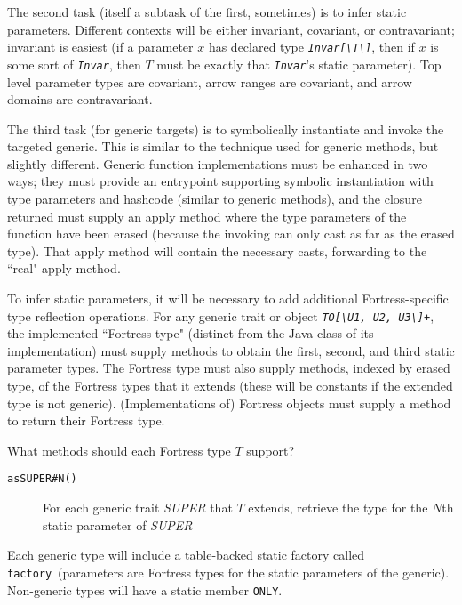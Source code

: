 \documentclass[11pt]{article}
\newcommand{\jvm}[1]{{\tt #1}}
\newcommand{\ftt}[1]{{\tt\slshape{#1}}}
\def\BS{\textbackslash}
\begin{document}
The second task (itself a subtask of the first, sometimes) is to infer static parameters.  Different contexts will be either invariant, covariant, or contravariant; invariant is easiest (if a parameter $x$ has declared type \ftt{Invar[\BS T\BS]}, then if $x$ is some sort of \ftt{Invar}, then $T$ must be exactly that \ftt{Invar}'s static parameter).  Top level parameter types are covariant, arrow ranges are covariant, and arrow domains are contravariant.

The third task (for generic targets) is to symbolically instantiate and invoke the targeted generic.  This is similar to the technique used for generic methods, but slightly different.  Generic function implementations must be enhanced in two ways; they must provide an entrypoint supporting symbolic instantiation with type parameters and hashcode (similar to generic methods), and the closure returned must supply an apply method where the type parameters of the function have been erased (because the invoking can only cast as far as the erased type).  That apply method will contain the necessary casts, forwarding to the ``real" apply method.

To infer static parameters, it will be necessary to add additional Fortress-specific type reflection operations.
For any generic trait or object \ftt{TO[\BS U1, U2, U3\BS]+}, the implemented ``Fortress type" (distinct from the Java class of its implementation) must supply methods to obtain the first, second, and third static parameter types.  The Fortress type must also supply methods, indexed by erased type, of the Fortress types that it extends (these will be constants if the extended type is not generic).  (Implementations of) Fortress objects must supply a method to return their Fortress type.

What methods should each Fortress type $T$ support?
\begin{description}
\item[\jvm{asSUPER\#N()}] For each generic trait {\it SUPER} that $T$ extends, retrieve the type for the $N$th static parameter of {\it SUPER} 
\end{description}
Each generic type will include a table-backed static factory called \verb+factory+\ (parameters are Fortress types for the static parameters of the generic).  Non-generic types will have a static member \verb+ONLY+.  
\end{document}
